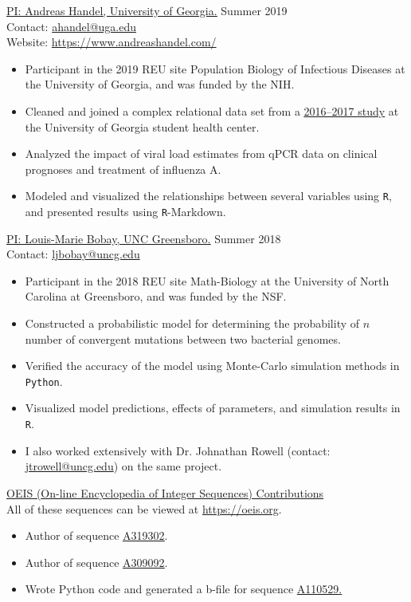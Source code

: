 \href{https://publichealth.uga.edu/faculty-member/andreas-handel/}{\ul{PI: Andreas Handel, University of Georgia.}} \hfill Summer 2019 \\
\indent Contact: \href{mailto:ahandel@uga.edu}{ahandel@uga.edu} \\
\indent Website: \href{https://www.andreashandel.com/}{https://www.andreashandel.com/}
\begin{itemize}[noitemsep]
\item Participant in the 2019 REU site Population Biology of Infectious Diseases at the University of Georgia, and was funded by the NIH.
\item Cleaned and joined a complex relational data set from a \href{https://www.jabfm.org/content/32/2/226}{\ul{2016--2017 study}} at the University of Georgia student health center.
\item Analyzed the impact of viral load estimates from qPCR data on clinical prognoses and treatment of influenza A. 
\item Modeled and visualized the relationships between several variables using \texttt{R}, and presented results using \texttt{R}-Markdown.
\end{itemize}

\href{https://biology.uncg.edu/people/louis-marie-bobay-2/}{\ul{PI: Louis-Marie Bobay, UNC Greensboro.}} \hfill Summer 2018 \\
\indent Contact: \href{mailto:ljbobay@uncg.edu}{ljbobay@uncg.edu} 
\begin{itemize}[noitemsep]
\item Participant in the 2018 REU site Math-Biology at the University of North Carolina at Greensboro, and was funded by the NSF.
\item Constructed a probabilistic model for determining the probability of $n$ number of convergent mutations between two bacterial genomes.
\item Verified the accuracy of the model using Monte-Carlo simulation methods in \texttt{Python}.
\item Visualized model predictions, effects of parameters, and simulation results in \texttt{R}.
\item I also worked extensively with Dr. Johnathan Rowell (contact: \href{mailto:jtrowell@uncg.edu}{jtrowell@uncg.edu}) on the same project.
\end{itemize}

\ul{OEIS (On-line Encyclopedia of Integer Sequences) Contributions} \\
\indent All of these sequences can be viewed at \url{https://oeis.org}.
\begin{itemize}[noitemsep]
\item Author of sequence \href{https://oeis.org/A319302}{\ul{A319302}}.
\item Author of sequence \href{https://oeis.org/A309092}{\ul{A309092}}.
\item Wrote Python code and generated a b-file for sequence \href{https://oeis.org/A110529}{\ul{A110529}.}
\end{itemize}